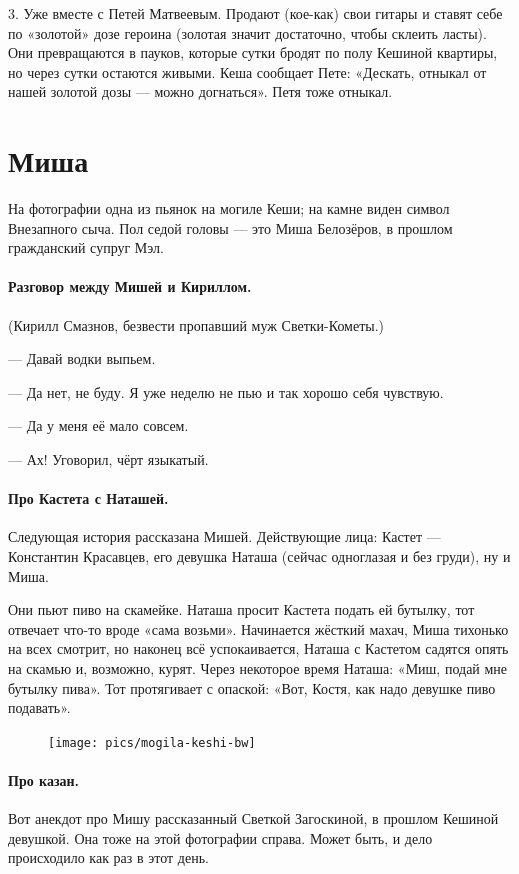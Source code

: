 \documentclass{book}
\begin{document}
3. Уже вместе с Петей Матвеевым.
Продают (кое-как) свои гитары и ставят себе по «золотой» дозе героина (золотая значит достаточно, чтобы склеить ласты).
Они превращаются в пауков, которые сутки бродят по полу Кешиной квартиры, но через сутки остаются живыми.
Кеша сообщает Пете: «Дескать, отныкал от нашей золотой дозы --- можно догнаться».
Петя тоже отныкал.

\section*{Миша}

На фотографии одна из пьянок на могиле Кеши;
на камне виден символ Внезапного сыча.
Пол седой головы --- это Миша Белозёров, в прошлом гражданский супруг Мэл.

\paragraph{Разговор между Мишей и Кириллом.} (Кирилл Смазнов, безвести пропавший муж Светки-Кометы.)

--- Давай водки выпьем.

--- Да нет, не буду.
Я уже неделю не пью и так хорошо себя чувствую.

--- Да у меня её мало совсем.

--- Ах! Уговорил, чёрт языкатый.

\paragraph{Про Кастета с Наташей.}
Следующая история рассказана Мишей.
Действующие лица: Кастет --- Константин Красавцев, его девушка Наташа (сейчас одноглазая и без груди), ну и Миша.

Они пьют пиво на скамейке.
Наташа просит Кастета подать ей бутылку, тот отвечает что-то вроде «сама возьми».
Начинается жёсткий махач, Миша тихонько на всех смотрит, но наконец всё успокаивается, Наташа с Кастетом садятся опять на скамью и, возможно, курят.
Через некоторое время Наташа: «Миш, подай мне бутылку пива».
Тот протягивает с опаской: «Вот, Костя, как надо девушке пиво подавать».

\begin{figure}
\vskip-5mm
\centering
\texttt{[image: pics/mogila-keshi-bw]}
\end{figure}

\paragraph{Про казан.}
Вот анекдот про Мишу рассказанный Светкой Загоскиной, в прошлом Кешиной девушкой.
Она тоже на этой фотографии справа.
Может быть, и дело происходило как раз в этот день.
\end{document}
